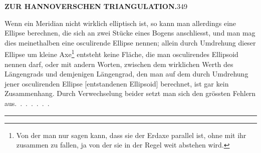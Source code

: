 \clearpage
\noindent\textbf{ZUR HANNOVERSCHEN TRIANGULATION.}\hfill349
\par\medskip
\begingroup
\makeatletter
\renewcommand{\@makefnmark}{\hbox{\normalfont\textsuperscript{*})}}
\makeatother
Wenn ein Meridian nicht wirklich elliptisch ist, so kann man allerdings
eine Ellipse berechnen, die sich an zwei Stücke eines Bogens anschliesst, und
man mag dies meinethalben eine osculirende Ellipse nennen; allein durch
Umdrehung dieser Ellipse um  kleine Axe\footnote{Von der man nur sagen kann, dass sie der Erdaxe parallel ist, ohne mit ihr zusammen zu fallen, ja von der sie in der Regel weit abstehen wird.} entsteht keine Fläche, die
man osculirendes Ellipsoid nennen darf, oder mit andern Worten, zwischen
dem wirklichen Werth des Längengrads und demjenigen Längengrad, den man
auf dem durch Umdrehung jener osculirenden Ellipse [entstandenen Ellipsoid]
berechnet, ist gar kein Zusammenhang. Durch Verwechselung beider setzt
man sich den grössten Fehlern aus.\ .\ .\ .\ .\ .\ .
\endgroup
\begin{center}\rule{.26\linewidth}{.4pt}\end{center}
